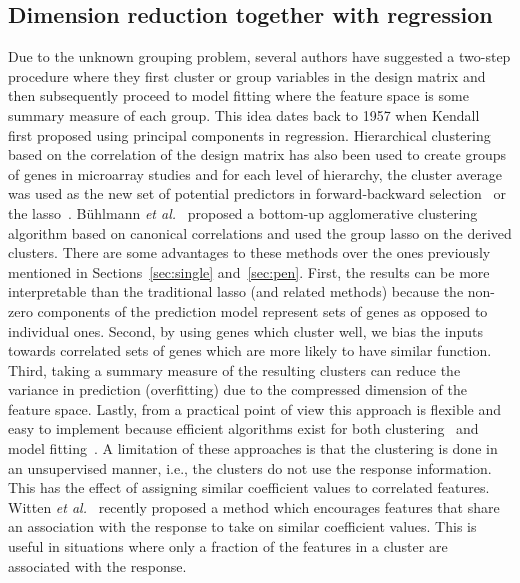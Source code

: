 \subsection{Dimension reduction together with regression}
Due to the unknown grouping problem, several authors have suggested a two-step procedure where they first cluster or group variables in the design matrix and then subsequently proceed to model fitting where the feature space is some summary measure of each group. 
This idea dates back to 1957 when Kendall~\citep{kendall1975multivariate} first proposed using principal components in regression. Hierarchical clustering based on the correlation of the design matrix has also been used to create groups of genes in microarray studies and for each level of hierarchy, the cluster average was used as the new set of potential predictors in forward-backward selection~\citep{hastie2001supervised} or the lasso~\citep{park2007averaged}. B{\"u}hlmann \textit{et al.}~\citep{buhlmann2013correlated} proposed a bottom-up agglomerative clustering algorithm based on canonical correlations and used the group lasso on the derived clusters. 
There are some advantages to these methods over the ones previously mentioned in Sections~\ref{sec:single} and~\ref{sec:pen}. 
First, the results can be more interpretable than the traditional lasso (and related methods) because the non-zero components of the prediction model represent sets of genes as opposed to individual ones. Second, by using genes which cluster well, we bias the inputs towards correlated sets of genes     
which are more likely to have similar function. 
Third, taking a summary measure of the resulting clusters can reduce the variance in prediction (overfitting) due to the compressed dimension of the feature space. Lastly, from a practical point of view this approach is flexible and easy to implement because efficient algorithms exist for both clustering~\citep{fastclust} and model fitting~\citep{friedman2010regularization,gglasso}. 
A limitation of these approaches is that the clustering is done in an unsupervised manner, i.e., the clusters do not use the response information. This has the effect of assigning similar coefficient values to correlated features. Witten \textit{et al.}~\citep{witten2014cluster} recently proposed a method which encourages features that share an association with the response to take on similar coefficient values. 
This is useful in situations where only a fraction of the features in a cluster are associated with the response. 




